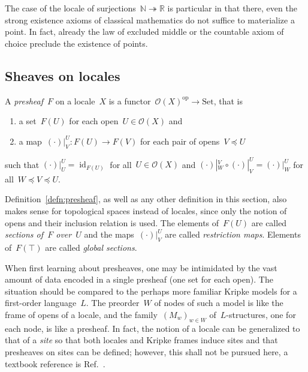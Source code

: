 \documentclass{ws-rv9x6}
\renewcommand{\O}{\mathcal{O}}
\newcommand{\NN}{\mathbb{N}}
\newcommand{\RR}{\mathbb{R}}
\newcommand{\op}{\mathrm{op}}
\newcommand{\Set}{\mathrm{Set}}
\renewcommand{\_}{\mathpunct{.}}
\newcommand{\?}{\,{:}\,}
\begin{document}
\begin{remark}The case of the locale of surjections~$\NN \twoheadrightarrow
\RR$ is particular in that there, even the strong existence axioms of
classical mathematics do not suffice to materialize a point. In fact, already
the law of excluded middle or the countable axiom of choice preclude the
existence of points.
\end{remark}


\subsection{Sheaves on locales}

\begin{definition}\label{defn:presheaf}
A \emph{presheaf}~$F$ on a locale~$X$ is a functor~$\O(X)^\op \to \Set$, that is
\begin{enumerate}
  \item a set~$F(U)$ for each open~$U \in \O(X)$ and
  \item a map~$(\cdot)|^U_V : F(U) \to F(V)$ for each pair of opens~$V \preceq U$
\end{enumerate}
such that $(\cdot)|^U_U = \operatorname{id}_{F(U)}$ for all~$U \in \O(X)$ and
$(\cdot)|^V_W \circ (\cdot)|^U_V = (\cdot)|^U_W$ for all~$W \preceq V
\preceq U$.\end{definition}

Definition~\ref{defn:presheaf}, as well as any other definition in this section,
also makes sense for topological spaces instead of locales, since only the
notion of opens and their inclusion relation is used. The elements of~$F(U)$ are
called \emph{sections of~$F$ over~$U$} and the maps~$(\cdot)|^U_V$
are called \emph{restriction maps}. Elements of~$F(\top)$ are called
\emph{global sections}.

When first learning about presheaves, one may be intimidated by the vast
amount of data encoded in a single presheaf (one set for each open). The
situation should be compared to the perhaps more familiar Kripke models for a first-order language~$L$. The
preorder~$W$ of nodes of such a model is like the frame of opens of a locale, and the
family~$(M_w)_{w \in W}$ of~$L$-structures, one for each node, is like a
presheaf. In fact, the notion of a locale can be generalized to that of a
\emph{site} so that both locales and Kripke frames induce sites and that
presheaves on sites can be defined; however, this shall not be pursued here,
a textbook reference is Ref.~.
\end{document}
